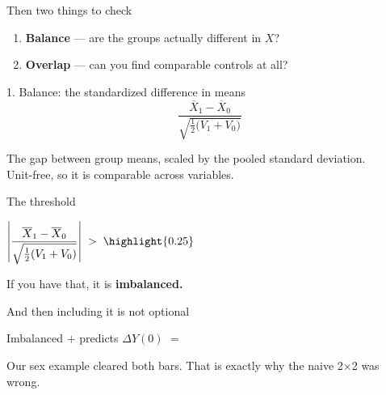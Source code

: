 \documentclass[aspectratio=169,11pt]{beamer}
\begin{document}
\begin{frame}{Then two things to check}
\vspace{1.4em}
\begin{enumerate}\setlength\itemsep{1.2em}
  \item[\textbf{1.}] \Large \textbf{Balance} --- are the groups actually different in $X$?
  \item[\textbf{2.}] \Large \textbf{Overlap} --- can you find comparable controls at all?
\end{enumerate}
\end{frame}

\begin{frame}{1. \;Balance: the standardized difference in means}
\vspace{1.4em}
\[
\frac{\overline{X}_1 - \overline{X}_0}{\sqrt{\tfrac{1}{2}\big(V_1 + V_0\big)}}
\]
\vspace{1em}
\begin{center}\color{warmgray}
The gap between group means, scaled by the pooled standard deviation. \\ Unit-free, so it is comparable across variables.
\end{center}
\end{frame}

\begin{frame}{The threshold}
\vspace{1.6em}
\begin{center}
\Large
$\left| \dfrac{\overline{X}_1 - \overline{X}_0}{\sqrt{\tfrac{1}{2}(V_1 + V_0)}} \right| \;>\; \highlight{0.25}$
\end{center}
\vspace{1.4em}
\begin{center}
If you have that, it is \textbf{imbalanced.}
\end{center}
\vspace{0.6em}
\end{frame}

\begin{frame}{And then including it is not optional}
\vspace{1.4em}
\begin{center}
\Large
Imbalanced \;$+$\; predicts $\Delta Y(0)$ \;$=$\; 
\end{center}
\vspace{1.4em}
\begin{center}\color{warmgray}
Our sex example cleared both bars. \;That is exactly why the naive 2$\times$2 was wrong.
\end{center}
\end{frame}
\end{document}
